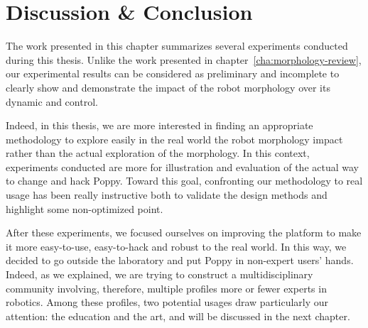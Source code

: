 

% 



\section{Discussion \& Conclusion } %

The work presented in this chapter summarizes several experiments conducted during this thesis.
Unlike the work presented in chapter~\ref{cha:morphology-review}, our experimental results can be considered as preliminary and incomplete to clearly show and demonstrate the impact of the robot morphology over its dynamic and control.

Indeed, in this thesis, we are more interested in finding an appropriate methodology to explore easily in the real world the robot morphology impact rather than the actual exploration of the morphology. In this context, experiments conducted are more for illustration and evaluation of the actual way to change and hack Poppy. Toward this goal, confronting our methodology to real usage has been really instructive both to validate the design methods and highlight some non-optimized point.

After these experiments, we focused ourselves on improving the platform to make it more easy-to-use, easy-to-hack and robust to the real world. In this way, we decided to go outside the laboratory and put Poppy in non-expert users' hands. Indeed, as we explained, we are trying to construct a multidisciplinary community involving, therefore, multiple profiles more or fewer experts in robotics. Among these profiles, two potential usages draw particularly our attention: the education and the art, and will be discussed in the next chapter.


